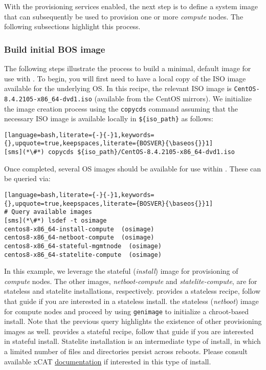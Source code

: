 
With the provisioning services enabled, the next step is to define
a system image that can subsequently be
used to provision one or more {\em compute} nodes. The following subsections highlight this process.

\subsubsection{Build initial BOS image} \label{sec:assemble_bos}
The following steps illustrate the process to build a minimal, default image for use with \xCAT{}. To begin, you will
first need to have a local copy of the ISO image available for the underlying OS. In this recipe, the relevant ISO image
is \texttt{CentOS-8.4.2105-x86\_64-dvd1.iso} (available from the CentOS mirrors). We initialize the image
creation process using the \texttt{copycds} command assuming that the necessary ISO image is available locally in 
\texttt{\$\{iso\_path\}} as follows:

\begin{lstlisting}[language=bash,literate={-}{-}1,keywords={},upquote=true,keepspaces,literate={BOSVER}{\baseos{}}1]
[sms](*\#*) copycds ${iso_path}/CentOS-8.4.2105-x86_64-dvd1.iso
\end{lstlisting}

\noindent Once completed, several OS images should be available for use within \xCAT{}. These can be queried via:

\begin{lstlisting}[language=bash,literate={-}{-}1,keywords={},upquote=true,keepspaces,literate={BOSVER}{\baseos{}}1]
# Query available images
[sms](*\#*) lsdef -t osimage
centos8-x86_64-install-compute  (osimage)
centos8-x86_64-netboot-compute  (osimage)
centos8-x86_64-stateful-mgmtnode  (osimage)
centos8-x86_64-statelite-compute  (osimage)
\end{lstlisting}

In this example, we leverage
the stateful ({\em install}) image for provisioning of {\em
compute} nodes.  The other images, {\em
netboot-compute} and {\em statelite-compute}, are for stateless and statelite
installations, respectively. \OHPC{} provides a stateless \xCAT{} recipe,
follow that guide if you are interested in a stateless install.
\else
the stateless ({\em netboot}) image for compute nodes and proceed by using
\texttt{genimage} to initialize a chroot-based install. Note that the previous query highlights the existence of other
provisioning images as well. \OHPC{} provides a stateful \xCAT{} recipe, 
follow that guide if you are interested in  stateful install.
\fi
Statelite installation is an intermediate type of install, in which a limited
number of files and directories persist across reboots.  Please consult
available xCAT \href{https://xcat-docs.readthedocs.io/en/stable/}{\color{blue}
documentation} if interested in this type of install.
